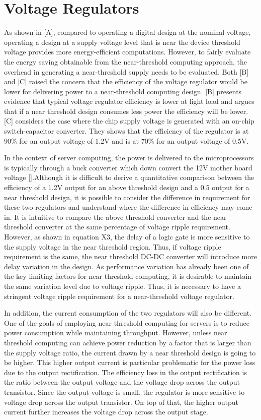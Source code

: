 \section{Voltage Regulators}

As shown in [A], compared to operating a digital design at the nominal voltage,
operating a design at a supply voltage level that is near the device threshold
voltage provides more energy-efficient computations. However, to fairly evaluate
the energy saving obtainable from the near-threshold computing approach, the
overhead in generating a near-threshold supply needs to be evaluated. Both [B]
and [C] raised the concern that the efficiency of the voltage regulator would be
lower for delivering power to a near-threshold computing design. [B] presents
evidence that typical voltage regulator efficiency is lower at light load and
argues that if a near threshold design consumes less power the efficiency will
be lower.  [C] considers the case where the chip supply voltage is generated
with an on-chip switch-capacitor converter. They shows that the efficiency of
the regulator is at 90\% for an output voltage of 1.2V and is at 70\% for an
output voltage of 0.5V.

In the context of server computing, the power is delivered to the
microprocessors is typically through a buck converter which down convert the 12V
mother board voltage [].Although it is difficult to derive a quantitative
comparison between the efficiency of a 1.2V output for an above threshold design
and a 0.5 output for a near threshold design, it is possible to consider the
difference in requirement for these two regulators and understand where the
difference in efficiency may come in. It is intuitive to compare the above
threshold converter and the near threshold converter at the same percentage of
voltage ripple requirement. However, as shown in equation X3, the delay of a
logic gate is more sensitive to the supply voltage in the near threshold region.
Thus, if voltage ripple requirement is the same, the near threshold DC-DC
converter will introduce more delay variation in the design. As performance
variation has already been one of the key limiting factors for near threshold
computing, it is desirable to maintain the same variation level due to voltage
ripple. Thus, it is necessary to have a stringent voltage ripple requirement for
a near-threshold voltage regulator. 

In addition, the current consumption of the two regulators will also be
different. One of the goals of employing near threshold computing for servers is
to reduce power consumption while maintaining throughput. However, unless near
threshold computing can achieve power reduction by a factor that is larger than
the supply voltage ratio, the current drawn by a near threshold design is going
to be higher. This higher output current is particular problematic for the power
loss due to the output rectification. The efficiency loss in the output
rectification is the ratio between the output voltage and the voltage drop
across the output transistor. Since the output voltage is small, the regulator
is more sensitive to voltage drop across the output transistor. On top of that,
the higher output current further increases the voltage drop across the output
stage.  

